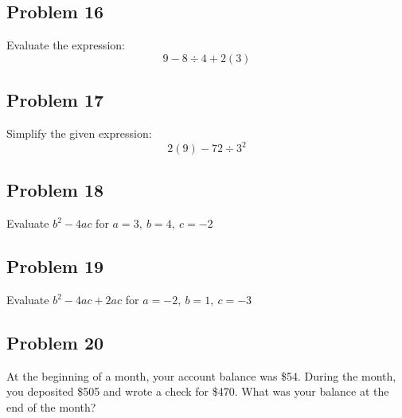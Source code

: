 \documentclass[12pt]{article}
\begin{document}
\subsection*{Problem 16}
Evaluate the expression:  
\[
9 - 8 \div 4 + 2(3)
\]

\subsection*{Problem 17}
Simplify the given expression:  
\[
2(9) - 72 \div 3^2
\]

\subsection*{Problem 18}
Evaluate \(b^2 - 4ac\) for \(a = 3,\ b = 4,\ c = -2\)

\subsection*{Problem 19}
Evaluate \(b^2 - 4ac + 2ac\) for \(a = -2,\ b = 1,\ c = -3\)

\subsection*{Problem 20}
At the beginning of a month, your account balance was \$54.  
During the month, you deposited \$505 and wrote a check for \$470.  
What was your balance at the end of the month?
\end{document}
